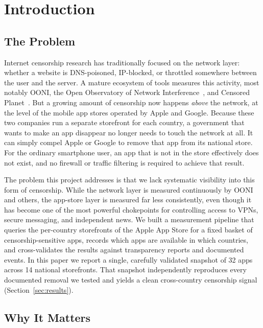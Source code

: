 \section{Introduction}\label{sec:intro}

\subsection{The Problem}

Internet censorship research has traditionally focused on the network layer:
whether a website is DNS-poisoned, IP-blocked, or throttled somewhere between the
user and the server. A mature ecosystem of tools measures this activity, most
notably OONI, the Open Observatory of Network
Interference~\cite{filasto2012ooni}, and Censored
Planet~\cite{sundararaman2020censoredplanet}. But a growing amount of censorship
now happens \emph{above} the network, at the level of the mobile app stores
operated by Apple and Google. Because these two companies run a separate
storefront for each country, a government that wants to make an app disappear no
longer needs to touch the network at all. It can simply compel Apple or Google to
remove that app from its national store. For the ordinary smartphone user, an app
that is not in the store effectively does not exist, and no firewall or traffic
filtering is required to achieve that result.

The problem this project addresses is that we lack systematic visibility into this
form of censorship. While the network layer is measured continuously by OONI and
others, the app-store layer is measured far less consistently, even though it has
become one of the most powerful chokepoints for controlling access to VPNs, secure
messaging, and independent news. We built a measurement pipeline that queries the
per-country storefronts of the Apple App Store for a fixed basket of
censorship-sensitive apps, records which apps are available in which countries, and
cross-validates the results against transparency reports and documented events. In
this paper we report a single, carefully validated snapshot of 32 apps across 14
national storefronts. That snapshot independently reproduces every documented
removal we tested and yields a clean cross-country censorship signal
(Section~\ref{sec:results}).

\subsection{Why It Matters}

